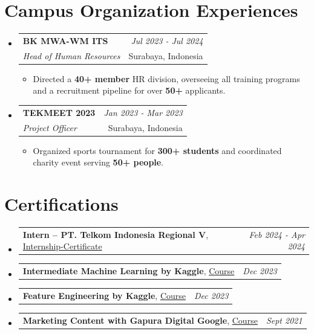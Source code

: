 \documentclass[a4paper,11pt]{article}
\makeatletter
\newcommand{\resumeItemMain}[1]{
  \item #1
}
\newcommand{\resumePOR}[3]{
\vspace{0.5mm}\item
    \begin{tabular*}{0.97\textwidth}[t]{l@{\extracolsep{\fill}}r}
        \textbf{#1}\hspace{0.3mm}#2 & \textit{\small{#3}} 
    \end{tabular*}
    \vspace{-2mm}
}
\newcommand{\resumeSubheading}[4]{
\vspace{0.5mm}\item
    \begin{tabular*}{0.98\textwidth}[t]{l@{\extracolsep{\fill}}r}
        \textbf{#1} & \textit{\footnotesize{#4}} \\
        \textit{\footnotesize{#3}} & \footnotesize{#2} \\
    \end{tabular*}
    \vspace{-2.4mm}
}
\newcommand{\resumeSubHeadingListStart}{\begin{itemize}[leftmargin=*,labelsep=0.1mm]}
\newcommand{\resumeItemListStart}{\begin{itemize}[leftmargin=*,labelsep=1mm,itemsep=0.5mm]}
\newcommand{\resumeSubHeadingListEnd}{\end{itemize}\vspace{2mm}}
\newcommand{\resumeItemListEnd}{\end{itemize}\vspace{-2mm}}
\makeatother
\begin{document}
\section{\textbf{Campus Organization Experiences}}
\vspace{-0.4mm}
\resumeSubHeadingListStart
\resumeSubheading
    {BK MWA-WM ITS}{Surabaya, Indonesia}
    {Head of Human Resources}{Jul 2023 - Jul 2024}
    \resumeItemListStart
        \resumeItemMain{Directed a \textbf{40+ member} HR division, overseeing all training programs and a recruitment pipeline for over \textbf{50+} applicants.}
    \resumeItemListEnd
\resumeSubheading
    {TEKMEET 2023}{Surabaya, Indonesia}
    {Project Officer}{Jan 2023 - Mar 2023}
    \resumeItemListStart
        \resumeItemMain{Organized sports tournament for \textbf{300+ students} and coordinated charity event serving \textbf{50+ people}.}
    \resumeItemListEnd
\resumeSubHeadingListEnd
\vspace{-6mm}

\section{\textbf{Certifications}}
\vspace{-0.4mm}
\resumeSubHeadingListStart
\resumePOR
    {Intern – PT. Telkom Indonesia Regional V} %
    {, \href{https://drive.google.com/file/d/1-nwVQKJeIozZTcpPC5dgL05BCwOs9G52/view?usp=sharing}{Internship-Certificate}} %
    {Feb 2024 - Apr 2024} %
    \resumePOR
    {Intermediate Machine Learning by Kaggle} %
    {, \href{https://drive.google.com/file/d/10e7CyfwJeKg05ooD73OZsyuTeGxPadMf/view?usp=drive_link}{Course}} %
    {Dec 2023} %
    \resumePOR
    {Feature Engineering by Kaggle} %
    {, \href{https://drive.google.com/file/d/1_ewhJnumW4lnMLSV74YxCJEBM53T57YN/view?usp=sharing}{Course}} %
    {Dec 2023} %
    \resumePOR
        {Marketing Content with Gapura Digital Google} %
        {, \href{https://drive.google.com/file/d/14aI4HshF3DZK0YVp-r2IjDUmXmzBtc64/view?usp=sharing}{Course}} %
        {Sept 2021} %
\resumeSubHeadingListEnd
\end{document}

